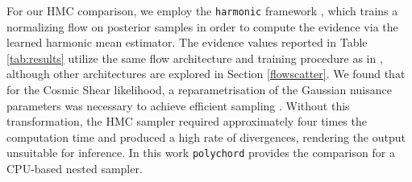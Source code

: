 \documentclass[twocolumn]{openjournal}
\begin{document}
For our HMC comparison, we employ the \texttt{harmonic} framework \citep{mcewen2023machinelearningassistedbayesian}, which trains a normalizing flow on posterior samples in order to compute the evidence via the learned harmonic mean estimator. The evidence values reported in Table \ref{tab:results} utilize the same flow architecture and training procedure as in \citep{Piras_2024}, although other architectures are explored in Section \ref{flowscatter}. We found that for the Cosmic Shear likelihood, a reparametrisation of the Gaussian nuisance parameters was necessary to achieve efficient sampling \citep{Betancourt2017HMC}. Without this transformation, the HMC sampler required approximately four times the computation time and produced a high rate of divergences, rendering the output unsuitable for inference. In this work \texttt{polychord} \citep{polychord,Polychord2} provides the comparison for a CPU-based nested sampler.
\end{document}
